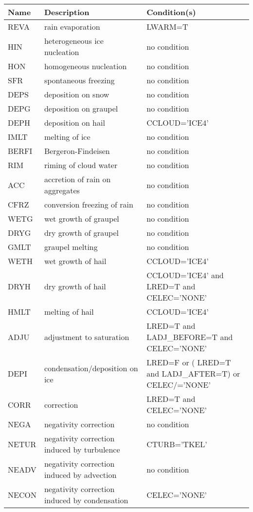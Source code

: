 \begin{longtable} {|p{}|p{}|p{}|}
\hline
Name & Description & Condition(s) \\
\hline \hline
\endhead
REVA   & rain evaporation                              & LWARM=T \\\hline
HIN    & heterogeneous ice nucleation                  & no condition \\\hline
HON    & homogeneous nucleation                        & no condition \\\hline
SFR    & spontaneous freezing                          & no condition \\\hline
DEPS   & deposition on snow                            & no condition \\\hline
DEPG   & deposition on graupel                         & no condition \\\hline
DEPH   & deposition on hail                            & CCLOUD='ICE4' \\\hline
IMLT   & melting of ice                                & no condition \\\hline
BERFI  & Bergeron-Findeisen                            & no condition \\\hline
RIM    & riming of cloud water                         & no condition \\\hline
ACC    & accretion of rain on aggregates               & no condition \\\hline
CFRZ   & conversion freezing of rain                   & no condition \\\hline
WETG   & wet growth of graupel                         & no condition \\\hline
DRYG   & dry growth of graupel                         & no condition \\\hline
GMLT   & graupel melting                               & no condition \\\hline
WETH   & wet growth of hail                            & CCLOUD='ICE4' \\\hline
DRYH   & dry growth of hail                            & CCLOUD='ICE4' and LRED=T and CELEC='NONE' \\\hline
HMLT   & melting of hail                               & CCLOUD='ICE4' \\\hline
ADJU   & adjustment to saturation                      & LRED=T and LADJ\_BEFORE=T and CELEC='NONE' \\\hline
DEPI   & condensation/deposition on ice                & LRED=F or ( LRED=T and LADJ\_AFTER=T) or CELEC/='NONE' \\\hline
CORR   & correction                                    & LRED=T and CELEC='NONE' \\\hline
NEGA   & negativity correction                         & no condition \\\hline
NETUR  & negativity correction induced by turbulence   & CTURB='TKEL' \\\hline
NEADV  & negativity correction induced by advection    & no condition \\\hline
NECON  & negativity correction induced by condensation & CELEC='NONE' \\\hline
\end{longtable}


